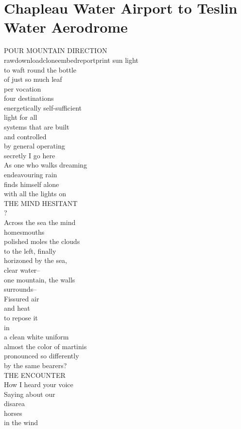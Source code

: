 \documentclass[smalldemyvopaper,11pt,twoside,onecolumn,openright,extrafontsizes]{memoir}
\begin{document}
\chapter{Chapleau Water Airport to Teslin Water Aerodrome}
POUR MOUNTAIN DIRECTION
\\rawdownloadcloneembedreportprint sun light
\\to waft round the bottle
\\of just so much leaf
\\per vocation
\\four destinations
\\energetically self-sufficient
\\light for all
\\systems that are built
\\and controlled
\\by general operating
\\secretly I go here
\\As one who walks dreaming
\\endeavouring rain
\\finds himself alone
\\with all the lights on
\\THE MIND HESITANT
\\?
\\Across the sea the mind
\\homesmouths
\\polished moles the clouds
\\to the left, finally
\\horizoned by the sea,
\\clear water--
\\one mountain, the walls
\\surrounds--
\\Fissured air
\\and heat
\\to repose it
\\in
\\a clean white uniform
\\almost the color of martinis
\\pronounced so differently
\\by the same bearers?
\\THE ENCOUNTER
\\How I heard your voice
\\Saying about our
\\disarea
\\horses
\\in the wind
\end{document}
